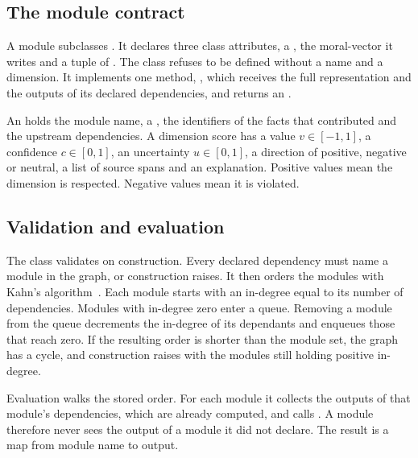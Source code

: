 \subsection{The module contract}

A module subclasses . It declares three class attributes, a , the
moral-vector  it writes and a tuple of . The class refuses to be
defined without a name and a dimension. It implements one method,
, which receives the full representation and the outputs of its
declared dependencies, and returns an .

An  holds the module name, a , the identifiers of the facts
that contributed and the upstream dependencies. A dimension score has a value $v \in [-1,1]$, a
confidence $c \in [0,1]$, an uncertainty $u \in [0,1]$, a direction of positive, negative or
neutral, a list of source spans and an explanation. Positive values mean the dimension is
respected. Negative values mean it is violated.

\subsection{Validation and evaluation}

The  class validates on construction. Every declared dependency must name a module in
the graph, or construction raises. It then orders the modules with Kahn's
algorithm~\cite{kahn1962topological}. Each module starts with an in-degree equal to its number of
dependencies. Modules with in-degree zero enter a queue. Removing a module from the queue
decrements the in-degree of its dependants and enqueues those that reach zero. If the resulting
order is shorter than the module set, the graph has a cycle, and construction raises with the
modules still holding positive in-degree.

Evaluation walks the stored order. For each module it collects the outputs of that module's
dependencies, which are already computed, and calls . A module therefore never
sees the output of a module it did not declare. The result is a map from module name to output.

